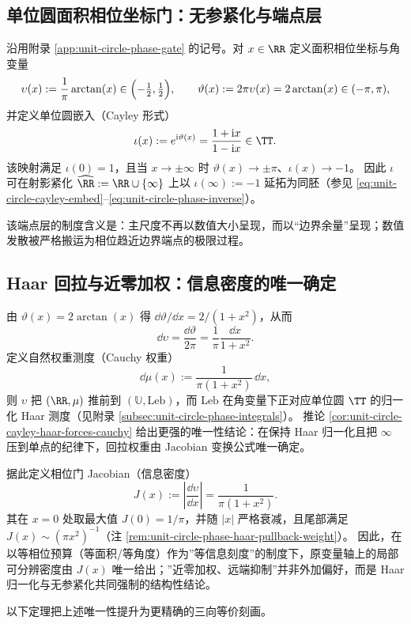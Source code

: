 \subsection{单位圆面积相位坐标门：无参紧化与端点层}\label{subsec:cdim-phase-gate-compactification}
沿用附录 \ref{app:unit-circle-phase-gate} 的记号。对 \(x\in\RR\) 定义面积相位坐标与角变量
\[
\upsilon(x):=\frac{1}{\pi}\arctan(x)\in\Bigl(-\tfrac12,\tfrac12\Bigr),
\qquad
\vartheta(x):=2\pi\upsilon(x)=2\arctan(x)\in(-\pi,\pi),
\]
并定义单位圆嵌入（Cayley 形式）
\[
\iota(x):=e^{\mathrm{i}\vartheta(x)}=\frac{1+\mathrm{i}x}{1-\mathrm{i}x}\in\TT.
\]
该映射满足 \(\iota(0)=1\)，且当 \(x\to\pm\infty\) 时 \(\vartheta(x)\to\pm\pi\)、\(\iota(x)\to-1\)。
因此 \(\iota\) 可在射影紧化 \(\widehat{\RR}:=\RR\cup\{\infty\}\) 上以 \(\iota(\infty):=-1\) 延拓为同胚（参见 \eqref{eq:unit-circle-cayley-embed}--\eqref{eq:unit-circle-phase-inverse}）。
\par
该端点层的制度含义是：主尺度不再以数值大小呈现，而以“边界余量”呈现；数值发散被严格搬运为相位趋近边界端点的极限过程。

\subsection{Haar 回拉与近零加权：信息密度的唯一确定}\label{subsec:cdim-haar-pullback}
由 \(\vartheta(x)=2\arctan(x)\) 得 \(\dd\vartheta/\dd x=2/(1+x^2)\)，从而
\[
\dd\upsilon=\frac{\dd\vartheta}{2\pi}=\frac{1}{\pi}\frac{\dd x}{1+x^2}.
\]
定义自然权重测度（Cauchy 权重）
\[
\dd\mu(x):=\frac{1}{\pi(1+x^2)}\,\dd x,
\]
则 \(\upsilon\) 把 \((\RR,\mu)\) 推前到 \((\mathbb{U},\mathrm{Leb})\)，而 \(\mathrm{Leb}\) 在角变量下正对应单位圆 \(\TT\) 的归一化 Haar 测度（见附录 \ref{subsec:unit-circle-phase-integrals}）。
推论 \ref{cor:unit-circle-cayley-haar-forces-cauchy} 给出更强的唯一性结论：在保持 Haar 归一化且把 \(\infty\) 压到单点的纪律下，回拉权重由 Jacobian 变换公式唯一确定。
\par
据此定义相位门 Jacobian（信息密度）
\[
J(x):=\left|\frac{\dd\upsilon}{\dd x}\right|=\frac{1}{\pi(1+x^2)}.
\]
其在 \(x=0\) 处取最大值 \(J(0)=1/\pi\)，并随 \(|x|\) 严格衰减，且尾部满足 \(J(x)\sim (\pi x^2)^{-1}\)（注 \ref{rem:unit-circle-phase-haar-pullback-weight}）。
因此，在以等相位预算（等面积/等角度）作为”等信息刻度”的制度下，原变量轴上的局部可分辨密度由 \(J(x)\) 唯一给出；”近零加权、远端抑制”并非外加偏好，而是 Haar 归一化与无参紧化共同强制的结构性结论。

以下定理把上述唯一性提升为更精确的三向等价刻画。

